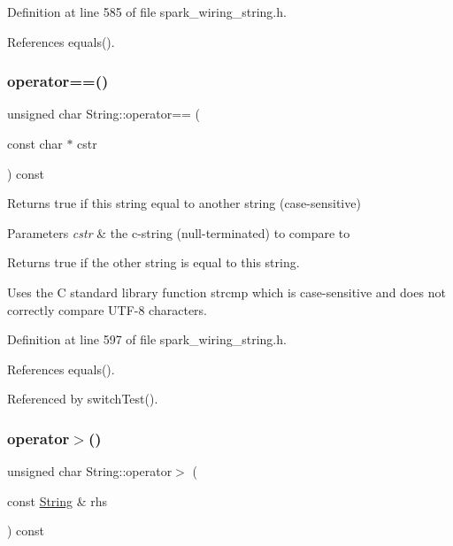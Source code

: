 Definition at line 585 of file spark\+\_\+wiring\+\_\+string.\+h.



References equals().

\mbox{\label{class_string_ad453b9631caf5d0164ae493bf1aa9680}} 
\subsubsection{\texorpdfstring{operator==()}{operator==()}\hspace{0.1cm}{\footnotesize\ttfamily [2/2]}}
{\footnotesize\ttfamily unsigned char String\+::operator== (\begin{DoxyParamCaption}\item[{const char $\ast$}]{cstr }\end{DoxyParamCaption}) const\hspace{0.3cm}{\ttfamily [inline]}}



Returns true if this string equal to another string (case-\/sensitive) 


\begin{DoxyParams}{Parameters}
{\em cstr} & the c-\/string (null-\/terminated) to compare to\\
\hline
\end{DoxyParams}
\begin{DoxyReturn}{Returns}
true if the other string is equal to this string.
\end{DoxyReturn}
Uses the C standard library function strcmp which is case-\/sensitive and does not correctly compare U\+T\+F-\/8 characters. 

Definition at line 597 of file spark\+\_\+wiring\+\_\+string.\+h.



References equals().



Referenced by switch\+Test().

\mbox{\label{class_string_a25bbbdda663b6b0eb3ed3458e80fc66e}} 
\subsubsection{\texorpdfstring{operator$>$()}{operator>()}}
{\footnotesize\ttfamily unsigned char String\+::operator$>$ (\begin{DoxyParamCaption}\item[{const \hyperlink{class_string}{String} \&}]{rhs }\end{DoxyParamCaption}) const}



